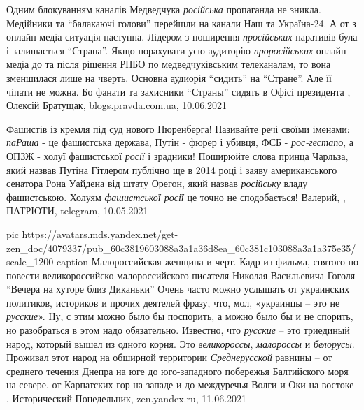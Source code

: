 Одним блокуванням каналів Медведчука \emph{російська} пропаганда не зникла.
Медійники та \enquote{балакаючі голови} перейшли на канали Наш та Україна-24.
А от з онлайн-медіа ситуація наступна.  Лідером з поширення \emph{просійських}
наративів була і залишається \enquote{Страна}.  Якщо порахувати усю аудиторію
\emph{проросійських} онлайн-медіа до та після рішення РНБО по медведчуківським
телеканалам, то вона зменшилася лише на чверть.  Основна аудиорія
\enquote{сидить} на \enquote{Стране}. Але її чіпати не можна. Бо фанати та
захисники \enquote{Страны} сидять в Офісі президента
, 
Олексій Братущак, blogs.pravda.com.ua, 10.06.2021

Фашистів із кремля під суд нового Нюренберга!  Називайте речі своїми іменами:
\emph{паРаша} - це фашистська держава, Путін - фюрер і убивця, ФСБ - \emph{рос-гестапо}, а
ОПЗЖ - холуї фашистської \emph{росії} і зрадники!  Поширюйте слова принца Чарльза,
який назвав Путіна Гітлером публічно ще в 2014 році і заяву американського
сенатора Рона Уайдена від штату Орегон, який назвав \emph{російську} владу
фашистською. Холуям \emph{фашистської росії} це точно не сподобається!
Валерий, , ПАТРІОТИ, telegram, 10.05.2021

\ifcmt
  pic https://avatars.mds.yandex.net/get-zen_doc/4079337/pub_60c3819603088a3a1a36d8ea_60c381c103088a3a1a375e35/scale_1200
	caption Малороссийская женщина и черт. Кадр из фильма, снятого по повести великороссийско-малороссийского писателя Николая Васильевича Гоголя \enquote{Вечера на хуторе близ Диканьки}
\fi
Очень часто можно услышать от украинских политиков, историков и прочих деятелей
фразу, что, мол, «украинцы – это не \emph{русские}». Ну, с этим можно было бы
поспорить, а можно было бы и не спорить, но разобраться в этом надо
обязательно.  Известно, что \emph{русские} – это триединый народ, который вышел из
одного корня. Это \emph{великороссы}, \emph{малороссы} и \emph{белорусы}. Проживал этот народ на
обширной территории \emph{Среднерусской} равнины – от среднего течения Днепра на юге
до юго-западного побережья Балтийского моря на севере, от Карпатских гор на
западе и до междуречья Волги и Оки на востоке
, 
Исторический Понедельник, zen.yandex.ru, 11.06.2021

